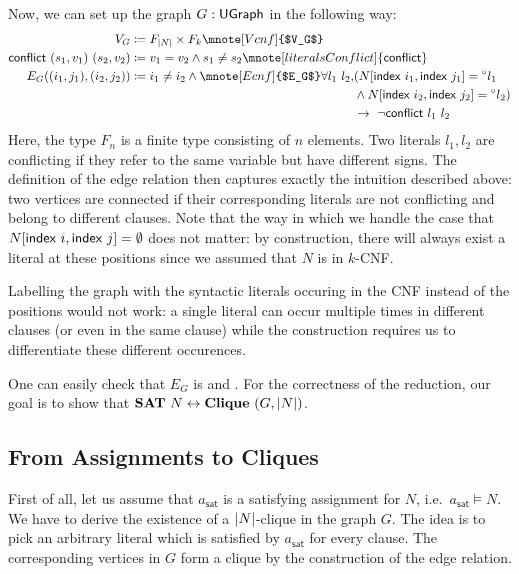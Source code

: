 \newcommand{\literalsConflict}{\textsf{conflict}}
Now, we can set up the graph $G : \textsf{UGraph}$ in the following way: 
\begin{align*} 
  V_G &\defeq F_{\length{N}} \times F_{k}\mnote[Vcnf]{$V_G$} \\
  \literalsConflict~(s_1, v_1)~(s_2, v_2) &\defeq v_1 = v_2 \land s_1 \neq s_2\mnote[literalsConflict]{\literalsConflict}\\
  E_G ((i_1, j_1), (i_2, j_2)) &\defeq i_1 \neq i_2 \land \mnote[Ecnf]{$E_G$}
  \begin{aligned}[t]
    \forall l_1~l_2, &(N[\findex{i_1}, \findex{j_1}] = \OSome{l_1} \\
                     &\land N[\findex{i_2}, \findex{j_2}] = \OSome{l_2}) \\
                     &\rightarrow~\lnot \literalsConflict~l_1~l_2 
  \end{aligned}
\end{align*}
Here, the type $F_n$ is a finite type consisting of $n$ elements. Two literals $l_1, l_2$ are conflicting if they refer to the same variable but have different signs. 
The definition of the edge relation then captures exactly the intuition described above: two vertices are connected if their corresponding literals are not conflicting and belong to different clauses. 
Note that the way in which we handle the case that $N[\textsf{index}~i, \textsf{index}~j] = \emptyset$ does not matter: by construction, there will always exist a literal at these positions since we assumed that $N$ is in $k$-CNF.

\begin{remark}
  Labelling the graph with the syntactic literals occuring in the CNF instead of the positions would not work: a single literal can occur multiple times in different clauses (or even in the same clause) while the construction requires us to differentiate these different occurences. 
\end{remark}

One can easily check that $E_G$ is  and .
For the correctness of the reduction, our goal is to show that $\textbf{SAT}{}~N \leftrightarrow \textbf{Clique}{}~(G, |N|)$. 

\subsection{From Assignments to Cliques}
First of all, let us assume that $a_\textsf{sat}$ is a satisfying assignment for $N$, i.e.\ $a_\textsf{sat} \models N$. 
We have to derive the existence of a $|N|$-clique in the graph $G$. The idea is to pick an arbitrary literal which is satisfied by $a_\textsf{sat}$ for every clause. The corresponding vertices in $G$ form a clique by the construction of the edge relation. 

